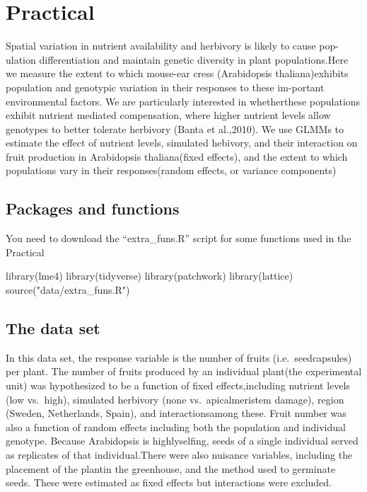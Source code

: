 \documentclass[
  12pt,
]{book}
\newenvironment{Shaded}{\begin{snugshade}}{\end{snugshade}}
\newcommand{\FunctionTok}[1]{\textcolor[rgb]{0.00,0.00,0.00}{#1}}
\newcommand{\NormalTok}[1]{#1}
\newcommand{\StringTok}[1]{\textcolor[rgb]{0.31,0.60,0.02}{#1}}
\begin{document}
\hypertarget{practical-3}{%
\section{Practical}\label{practical-3}}

Spatial variation in nutrient availability and herbivory is likely to cause pop-ulation differentiation and maintain genetic diversity in plant populations.Here we measure the extent to which mouse-ear cress (Arabidopsis thaliana)exhibits population and genotypic variation in their responses to these im-portant environmental factors. We are particularly interested in whetherthese populations exhibit nutrient mediated compensation, where higher nutrient levels allow genotypes to better tolerate herbivory (Banta et al.,2010). We use GLMMs to estimate the effect of nutrient levels, simulated hebivory, and their interaction on fruit production in Arabidopsis thaliana(fixed effects), and the extent to which populations vary in their responses(random effects, or variance components)

\hypertarget{packages-and-functions}{%
\subsection{Packages and functions}\label{packages-and-functions}}

You need to download the ``extra\_funs.R'' script for some functions used in the Practical

\begin{Shaded}
\begin{Highlighting}[]
\FunctionTok{library}\NormalTok{(lme4)}
\FunctionTok{library}\NormalTok{(tidyverse)}
\FunctionTok{library}\NormalTok{(patchwork)}
\FunctionTok{library}\NormalTok{(lattice)}
\FunctionTok{source}\NormalTok{(}\StringTok{"data/extra\_funs.R"}\NormalTok{)}
\end{Highlighting}
\end{Shaded}

\hypertarget{the-data-set}{%
\subsection{The data set}\label{the-data-set}}

In this data set, the response variable is the number of fruits (i.e.~seedcapsules) per plant. The number of fruits produced by an individual plant(the experimental unit) was hypothesized to be a function of fixed effects,including nutrient levels (low vs.~high), simulated herbivory (none vs.~apicalmeristem damage), region (Sweden, Netherlands, Spain), and interactionsamong these. Fruit number was also a function of random effects including both the population and individual genotype. Because Arabidopsis is highlyselfing, seeds of a single individual served as replicates of that individual.There were also nuisance variables, including the placement of the plantin the greenhouse, and the method used to germinate seeds. These were estimated as fixed effects but interactions were excluded.
\end{document}
